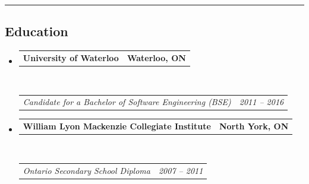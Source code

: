 \documentclass[10pt,letterpaper]{article}
\makeatletter
\newcommand{\headerrow}[2]
{\begin{tabular*}{\linewidth}{l@{\extracolsep{\fill}}r}
	#1 &
	#2 \\
\end{tabular*}}
\makeatother
\begin{document}
\hrule
\vspace{-0.4em}
\subsection*{Education}

\begin{itemize}
	\parskip=0.1em

	\item 
	\headerrow
		{\textbf{University of Waterloo}}
		{\textbf{Waterloo, ON}}
	\\
	\headerrow
		{\emph{Candidate for a Bachelor of Software Engineering (BSE)}}
		{\emph{2011 -- 2016}}
		
	\item 
	\headerrow
		{\textbf{William Lyon Mackenzie Collegiate Institute}}
		{\textbf{North York, ON}}
	\\
	\headerrow
		{\emph{Ontario Secondary School Diploma}}
		{\emph{2007 -- 2011}}
		

\end{itemize}
\end{document}
